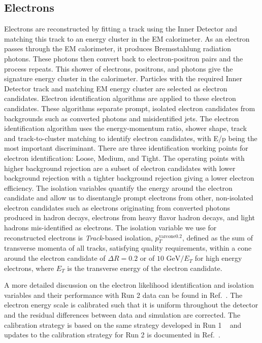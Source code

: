 \subsection{Electrons}
Electrons are reconstructed by fitting a track using the Inner Detector and matching this track to an energy cluster in the EM calorimeter\cite{Tarna:2286383}. As an electron passes through the EM calorimeter, it produces Bremsstahlung radiation photons. These photons then convert back to electron-positron pairs and the process repeats. This shower of electrons, positrons, and photons give the signature energy cluster in the calorimeter. Particles with the required Inner Detector track and matching EM energy cluster are selected as electron candidates.\newline
\indent Electron identification algorithms are applied to these electron candidates. These algorithms separate prompt, isolated electron candidates from backgrounds such as converted photons and misidentified jets. The electron identification algorithm uses the energy-momentum ratio, shower shape, track and track-to-cluster matching to identify electron candidates, with E/p being the most important discriminant. There are three identification working points for electron identification: Loose, Medium, and Tight. The operating points with higher background rejection are a subset of electron candidates with lower background rejection with a tighter background rejection giving a lower electron efficiency. \newline
\indent The isolation variables quantify the energy around the electron candidate and allow us to disentangle prompt electrons 
from other, non-isolated electron candidates such as electrons originating 
from converted photons produced in hadron decays, electrons from heavy flavor hadron decays, 
and light hadrons mis-identified as electrons. The isolation variable we use for reconstructed electrons 
is \textit{Track}-based isolation, ${p_{T}^{\mathrm{varcone0.2}}}$, defined as the sum of transverse momenta
of all tracks, satisfying quality requirements, within a cone around the electron candidate of ${\Delta R = 0.2}$ or of ${10\text{ GeV}/E_{T}}$ for high energy electrons, where $E_{T}$ is the transverse energy of the electron candidate.

A more detailed discussion on the electron likelihood identification and isolation variables 
and their performance with Run 2 data can be found in Ref.~\cite{ATLAS-CONF-2016-024}. 
The electron energy scale is calibrated such that it is uniform throughout the detector and the residual differences
between data and simulation are corrected. The calibration strategy is based on the same strategy developed 
in Run 1 ~\cite{ATLAS-EGAMMACALIB-RUN1} and updates to the calibration strategy for Run 2 is 
documented in Ref.~\cite{ATL-PHYS-PUB-2016-015}.
